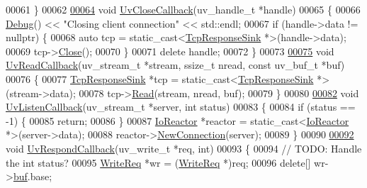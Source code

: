 \begin{DoxyCode}
00061 \}
00062 
\hypertarget{io__reactor_8cpp_source_l00064}{}\hyperlink{io__reactor_8cpp_ab85791c3e9c737453047decfbb7388f4}{00064} \textcolor{keywordtype}{void} \hyperlink{io__reactor_8cpp_ab85791c3e9c737453047decfbb7388f4}{UvCloseCallback}(uv\_handle\_t *handle)
00065 \{
00066     \hyperlink{classDebug}{Debug}() << \textcolor{stringliteral}{"Closing client connection"} << std::endl;
00067     \textcolor{keywordflow}{if} (handle->data != \textcolor{keyword}{nullptr}) \{
00068         \textcolor{keyword}{auto} tcp = \textcolor{keyword}{static\_cast<}\hyperlink{classTcpResponseSink}{TcpResponseSink} *\textcolor{keyword}{>}(handle->data);
00069         tcp->\hyperlink{classTcpResponseSink_a2e40c526177918ade20bec1e4f66698a}{Close}();
00070     \}
00071     \textcolor{keyword}{delete} handle;
00072 \}
00073 
\hypertarget{io__reactor_8cpp_source_l00075}{}\hyperlink{io__reactor_8cpp_a8c1937e7aebd228e6a5eab19f1add9f9}{00075} \textcolor{keywordtype}{void} \hyperlink{io__reactor_8cpp_a8c1937e7aebd228e6a5eab19f1add9f9}{UvReadCallback}(uv\_stream\_t *stream, ssize\_t nread, \textcolor{keyword}{const} uv\_buf\_t *buf)
00076 \{
00077     \hyperlink{classTcpResponseSink}{TcpResponseSink} *tcp = \textcolor{keyword}{static\_cast<}\hyperlink{classTcpResponseSink}{TcpResponseSink} *\textcolor{keyword}{>}(stream->data);
00078     tcp->\hyperlink{classTcpResponseSink_a9ee277599dbd6cfc5853a9145f21694b}{Read}(stream, nread, buf);
00079 \}
00080 
\hypertarget{io__reactor_8cpp_source_l00082}{}\hyperlink{io__reactor_8cpp_ab1a411534cf6420d24748b0e78927ebf}{00082} \textcolor{keywordtype}{void} \hyperlink{io__reactor_8cpp_ab1a411534cf6420d24748b0e78927ebf}{UvListenCallback}(uv\_stream\_t *server, \textcolor{keywordtype}{int} status)
00083 \{
00084     \textcolor{keywordflow}{if} (status == -1) \{
00085         \textcolor{keywordflow}{return};
00086     \}
00087     \hyperlink{classIoReactor}{IoReactor} *reactor = \textcolor{keyword}{static\_cast<}\hyperlink{classIoReactor}{IoReactor} *\textcolor{keyword}{>}(server->data);
00088     reactor->\hyperlink{classIoReactor_a535c6ff0899391afc02c87b1dfe7c6e2}{NewConnection}(server);
00089 \}
00090 
\hypertarget{io__reactor_8cpp_source_l00092}{}\hyperlink{io__reactor_8cpp_af58ed397c8d93bffdc01b621d4abaa8c}{00092} \textcolor{keywordtype}{void} \hyperlink{io__reactor_8cpp_af58ed397c8d93bffdc01b621d4abaa8c}{UvRespondCallback}(uv\_write\_t *req, \textcolor{keywordtype}{int})
00093 \{
00094     \textcolor{comment}{// TODO: Handle the int status?}
00095     \hyperlink{structWriteReq}{WriteReq} *wr = (\hyperlink{structWriteReq}{WriteReq} *)req;
00096     \textcolor{keyword}{delete}[] wr->\hyperlink{structWriteReq_a2e611e010ab154c56c8055dee140b6b5}{buf}.base;

\end{DoxyCode}
